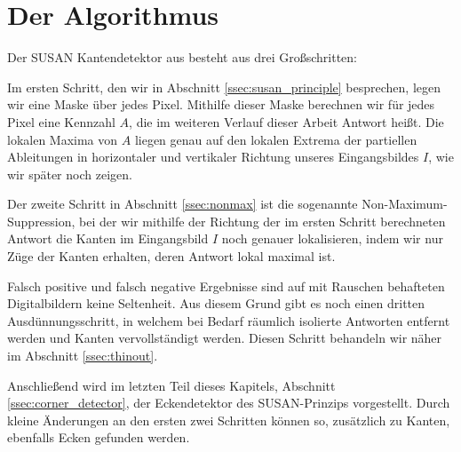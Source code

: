 \documentclass[a4paper, 11pt]{report}
\theoremstyle{definition}
\begin{document}
	\section{Der Algorithmus}\label{sec:thealgorithm}
		Der SUSAN Kantendetektor aus \cite{SUSAN} besteht aus drei Großschritten:

		Im ersten Schritt, den wir in Abschnitt \ref{ssec:susan_principle} besprechen, legen wir eine Maske über jedes Pixel. Mithilfe dieser Maske berechnen wir für jedes Pixel eine Kennzahl $A$, die im weiteren Verlauf dieser Arbeit \glqq Antwort\grqq{} heißt. Die lokalen Maxima von $A$ liegen genau auf den lokalen Extrema der partiellen Ableitungen in horizontaler und vertikaler Richtung unseres Eingangsbildes $I$, wie wir später noch zeigen.

		Der zweite Schritt in Abschnitt \ref{ssec:nonmax} ist die sogenannte Non-Maximum-Suppression, bei der wir mithilfe der Richtung der im ersten Schritt berechneten Antwort die Kanten im Eingangsbild $I$ noch genauer lokalisieren, indem wir nur Züge der Kanten erhalten, deren Antwort lokal maximal ist.

		Falsch positive und falsch negative Ergebnisse sind auf mit Rauschen behafteten Digitalbildern keine Seltenheit. Aus diesem Grund gibt es noch einen dritten Ausdünnungsschritt, in welchem bei Bedarf räumlich isolierte Antworten entfernt werden und Kanten vervollständigt werden. Diesen Schritt behandeln wir näher im Abschnitt \ref{ssec:thinout}.

		Anschließend wird im letzten Teil dieses Kapitels, Abschnitt \ref{ssec:corner_detector}, der Eckendetektor des SUSAN-Prinzips vorgestellt. Durch kleine Änderungen an den ersten zwei Schritten können so, zusätzlich zu Kanten, ebenfalls Ecken gefunden werden.
\end{document}
